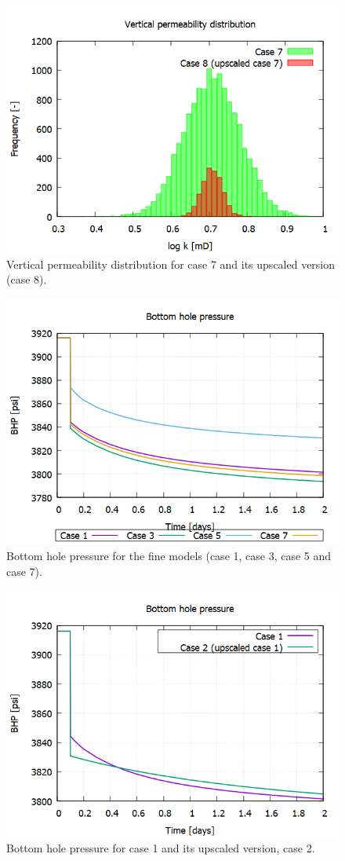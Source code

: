 \begin{figure}[H]
	\centering
	\includegraphics[width=0.8\linewidth]{Images/44}
	\caption{Vertical permeability distribution for case 7 and its upscaled version (case 8).}
	\label{fig:44}
\end{figure}

\begin{figure}[H]
	\centering
	\includegraphics[width=0.8\linewidth]{Images/46}
	\caption{Bottom hole pressure for the fine models (case 1, case 3, case 5 and case 7).}
	\label{fig:46}
\end{figure}

\begin{figure}[H]
	\centering
	\includegraphics[width=0.8\linewidth]{Images/47}
	\caption{Bottom hole pressure for case 1 and its upscaled version, case 2.}
	\label{fig:47}
\end{figure}

